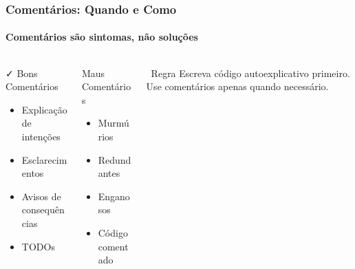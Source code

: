 \documentclass[aspectratio=169]{beamer}
\begin{document}
\begin{frame}
\frametitle{Comentários: Quando e Como}
\framesubtitle{Comentários são sintomas, não soluções}

\begin{center}
\end{center}

\vspace{0.5cm}
\begin{columns}
\begin{column}{0.3\textwidth}
\begin{block}{\textcolor{cleangreen}{\faCheck} Bons Comentários}
\begin{itemize}
    \item Explicação de intenções
    \item Esclarecimentos
    \item Avisos de consequências
    \item TODOs
\end{itemize}
\end{block}
\end{column}

\begin{column}{0.3\textwidth}
\begin{block}{\textcolor{cleanred}{\faTimes} Maus Comentários}
\begin{itemize}
    \item Murmúrios
    \item Redundantes
    \item Enganosos
    \item Código comentado
\end{itemize}
\end{block}
\end{column}

\begin{column}{0.3\textwidth}
\begin{block}{\faInfoCircle\ Regra}
Escreva código autoexplicativo primeiro. Use comentários apenas quando necessário.
\end{block}
\end{column}
\end{columns}
\end{frame}
\end{document}
